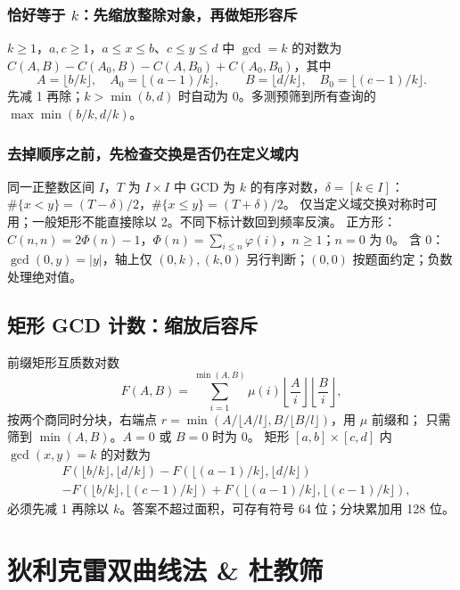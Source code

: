 \subsubsection{恰好等于 \texorpdfstring{$k$}{k}：先缩放整除对象，再做矩形容斥}
$k\ge1$，$a,c\ge1$，$a\le x\le b$、$c\le y\le d$ 中 $\gcd=k$ 的对数为
$C(A,B)-C(A_0,B)-C(A,B_0)+C(A_0,B_0)$，其中
\[
A=\lfloor b/k\rfloor,\quad A_0=\lfloor(a-1)/k\rfloor,\qquad
B=\lfloor d/k\rfloor,\quad B_0=\lfloor(c-1)/k\rfloor.
\]
先减 1 再除；$k>\min(b,d)$ 时自动为 0。多测预筛到所有查询的 $\max\min(b/k,d/k)$。

\subsubsection{去掉顺序之前，先检查交换是否仍在定义域内}
同一正整数区间 $I$，$T$ 为 $I\times I$ 中 GCD 为 $k$ 的有序对数，$\delta=[k\in I]$：
$\#\{x<y\}=(T-\delta)/2$，$\#\{x\le y\}=(T+\delta)/2$。
仅当定义域交换对称时可用；一般矩形不能直接除以 2。不同下标计数回到频率反演。
正方形：$C(n,n)=2\Phi(n)-1$，$\Phi(n)=\sum_{i\le n}\varphi(i)$，$n\ge1$；$n=0$ 为 0。
含 0：$\gcd(0,y)=|y|$，轴上仅 $(0,k),(k,0)$ 另行判断；$(0,0)$ 按题面约定；负数处理绝对值。



\subsection{矩形 GCD 计数：缩放后容斥}\label{knowledge-coprime-rectangles}
前缀矩形互质数对数
\[
F(A,B)=\sum_{i=1}^{\min(A,B)}\mu(i)\left\lfloor\frac Ai\right\rfloor
\left\lfloor\frac Bi\right\rfloor,
\]
按两个商同时分块，右端点 $r=\min(A/\lfloor A/l\rfloor,B/\lfloor B/l\rfloor)$，用 $\mu$ 前缀和；
只需筛到 $\min(A,B)$。$A=0$ 或 $B=0$ 时为 0。
矩形 $[a,b]\times[c,d]$ 内 $\gcd(x,y)=k$ 的对数为
\[
\begin{aligned}
&F(\lfloor b/k\rfloor,\lfloor d/k\rfloor)
-F(\lfloor(a-1)/k\rfloor,\lfloor d/k\rfloor)\\
&-F(\lfloor b/k\rfloor,\lfloor(c-1)/k\rfloor)
+F(\lfloor(a-1)/k\rfloor,\lfloor(c-1)/k\rfloor),
\end{aligned}
\]
必须先减 1 再除以 $k$。答案不超过面积，可存有符号 64 位；分块累加用 128 位。



\Needspace{180pt}

\section{狄利克雷双曲线法 \& 杜教筛}

